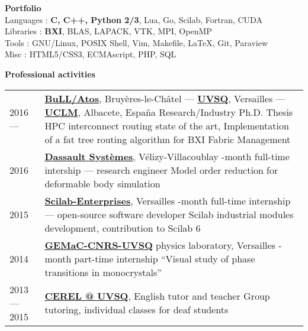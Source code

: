 {\large\bf Portfolio}
\hrulefill\\[.2cm]
Languages : {\bf C, C++, Python 2/3}, Lua, Go, Scilab, Fortran, CUDA \\
Libraries : {\bf BXI}, BLAS, LAPACK, VTK, MPI, OpenMP \\
Tools : GNU/Linux, POSIX Shell, Vim, Makefile, \LaTeX, Git, Paraview \\
Misc : HTML5/CSS3, ECMAscript, PHP, SQL
\vspace{.3cm}

{\large\bf Professional activities}
\hrulefill\\[.2cm]
{
    \setlength{\extrarowheight}{.2cm}
    \begin{tabularx}{\textwidth}{lX}
        2016 — &
        \href{https://atos.net} {\bf BuLL/Atos}, Bruyères-le-Châtel —
        \href{http://uvsq.fr} {\bf UVSQ}, Versailles —
        \href{http://uclm.es} {\bf UCLM}, Albacete, España
        \newline
        Research/Industry Ph.D. Thesis
        \newline
        HPC interconnect routing state of the art,
        \newline
        Implementation of a fat tree routing algorithm for BXI Fabric Management
        \\
        2016 &
        \href{https://3ds.com}
        {\bf Dassault Systèmes}, Vélizy-Villacoublay
        \newline
        6-month full-time intership — research engineer
        \newline
        Model order reduction for deformable body simulation
        \\
        2015 &
        \href{http://www.scilab-enterprises.com}
        {\bf Scilab-Enterprises}, Versailles
        \newline
        4-month full-time internship — open-source software developer
        \newline
        Scilab industrial modules development, contribution to Scilab 6
        \\
        2014 &
        \href{http://www.gemac.uvsq.fr/}
        {\bf GEMaC-CNRS-UVSQ} physics laboratory, Versailles
        \newline
        6-month part-time internship
        \newline
        ``Visual study of phase transitions in monocrystals''\\
        2013 — 2015 &
        \href{http://www.cerel.uvsq.fr/presentation-291090.kjsp}
        {\bf CEREL \makeatletter @ \makeatother UVSQ},
        English tutor and teacher
        \newline
        Group tutoring, individual classes for deaf students\
    \end{tabularx}
}
\vspace{.3cm}

